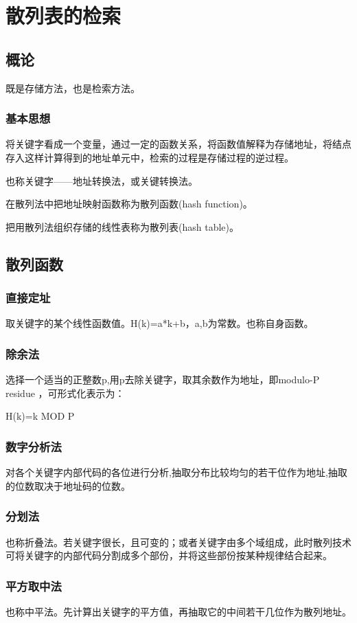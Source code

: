 \documentclass[AutoFakeBold]{LZUThesis2007}
\begin{document}
	\section{散列表的检索}
		\subsection{概论}
		既是存储方法，也是检索方法。
			\subsubsection{基本思想}
			将关键字看成一个变量，通过一定的函数关系，将函数值解释为存储地址，将结点存入这样计算得到的地址单元中，检索的过程是存储过程的逆过程。

			也称关键字——地址转换法，或关键转换法。

			在散列法中把地址映射函数称为散列函数(hash function)。

			把用散列法组织存储的线性表称为散列表(hash table)。
		\subsection{散列函数}
			\subsubsection{直接定址}
			取关键字的某个线性函数值。H(k)=a*k+b，a,b为常数。也称自身函数。

			\subsubsection{除余法}
			选择一个适当的正整数p,用p去除关键字，取其余数作为地址，即modulo-P residue ，可形式化表示为：
			
			H(k)=k MOD P
   
			\subsubsection{数字分析法}
			对各个关键字内部代码的各位进行分析,抽取分布比较均匀的若干位作为地址,抽取的位数取决于地址码的位数。
			\subsubsection{分划法}
			也称折叠法。若关键字很长，且可变的；或者关键字由多个域组成，此时散列技术可将关键字的内部代码分割成多个部份，并将这些部份按某种规律结合起来。

			\subsubsection{平方取中法}
			也称中平法。先计算出关键字的平方值，再抽取它的中间若干几位作为散列地址。
\end{document}
